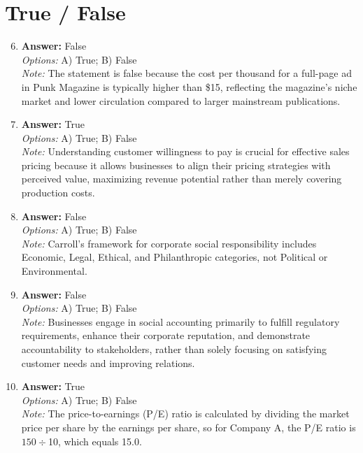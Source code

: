 \documentclass[12pt]{article}
\begin{document}
\section*{True / False}
\begin{enumerate}[label=\arabic*.]
\setcounter{enumi}{5}
\item \textbf{Answer:} False
\\ \textit{Options:} A) True; B) False
\\ \textit{Note:} The statement is false because the cost per thousand for a full-page ad in Punk Magazine is typically higher than \$15, reflecting the magazine's niche market and lower circulation compared to larger mainstream publications.
\item \textbf{Answer:} True
\\ \textit{Options:} A) True; B) False
\\ \textit{Note:} Understanding customer willingness to pay is crucial for effective sales pricing because it allows businesses to align their pricing strategies with perceived value, maximizing revenue potential rather than merely covering production costs.
\item \textbf{Answer:} False
\\ \textit{Options:} A) True; B) False
\\ \textit{Note:} Carroll's framework for corporate social responsibility includes Economic, Legal, Ethical, and Philanthropic categories, not Political or Environmental.
\item \textbf{Answer:} False
\\ \textit{Options:} A) True; B) False
\\ \textit{Note:} Businesses engage in social accounting primarily to fulfill regulatory requirements, enhance their corporate reputation, and demonstrate accountability to stakeholders, rather than solely focusing on satisfying customer needs and improving relations.
\item \textbf{Answer:} True
\\ \textit{Options:} A) True; B) False
\\ \textit{Note:} The price-to-earnings (P/E) ratio is calculated by dividing the market price per share by the earnings per share, so for Company A, the P/E ratio is $150 ÷ $10, which equals 15.0.
\end{enumerate}
\end{document}
